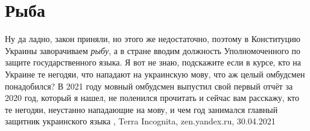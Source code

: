  
 
 
 
 
\chapter{Рыба}

Ну да ладно, закон приняли, но этого же недостаточно, поэтому в Конституцию
Украины заворачиваем \emph{рыбу}, а в стране вводим должность Уполномоченного по
защите государственного языка. Я вот не знаю, подскажите если в курсе, кто на
Украине те негодяи, что нападают на украинскую мову, что аж целый омбудсмен
понадобился?  В 2021 году мовный омбудсмен выпустил свой первый отчёт за 2020
год, который я нашел, не поленился прочитать и сейчас вам расскажу, кто те
негодяи, неустанно нападающие на мову, и чем год занимался главный защитник
украинского языка
, 
Terra Incognita, zen.yandex.ru, 30.04.2021
